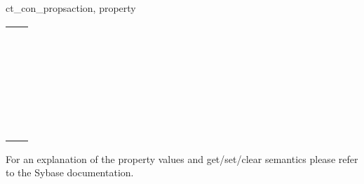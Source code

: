\begin{methoddesc}[CS_CONNECTION]{ct_con_props}{action, property }
\begin{longtable}{l|l}
\code{CS_CON_STATUS}           & \code{int} \\
\code{CS_LOOP_DELAY}           & \code{int} \\
\code{CS_RETRY_COUNT}          & \code{int} \\
\code{CS_NETIO}                & \code{int} \\
\code{CS_TEXTLIMIT}            & \code{int} \\
\code{CS_DS_SEARCH}            & \code{int} \\
\code{CS_DS_SIZELIMIT}         & \code{int} \\
\code{CS_DS_TIMELIMIT}         & \code{int} \\
\code{CS_ENDPOINT}             & \code{int} \\
\code{CS_PACKETSIZE}           & \code{int} \\
\code{CS_SEC_CREDTIMEOUT}      & \code{int} \\
\code{CS_SEC_SESSTIMEOUT}      & \code{int} \\

\code{CS_APPNAME}              & \code{string} \\
\code{CS_HOSTNAME}             & \code{string} \\
\code{CS_PASSWORD}             & \code{string} \\
\code{CS_SERVERNAME}           & \code{string} \\
\code{CS_USERNAME}             & \code{string} \\
\code{CS_TDS_VERSION}          & \code{string} \\
\code{CS_DS_DITBASE}           & \code{string} \\
\code{CS_DS_PASSWORD}          & \code{string} \\
\code{CS_DS_PRINCIPAL}         & \code{string} \\
\code{CS_DS_PROVIDER}          & \code{string} \\
\code{CS_SEC_KEYTAB}           & \code{string} \\
\code{CS_SEC_MECHANISM}        & \code{string} \\
\code{CS_SEC_SERVERPRINCIPAL}  & \code{string} \\
\code{CS_TRANSACTION_NAME}     & \code{string} \\

\code{CS_EED_CMD}              & \code{CS_COMMAND} \\
\end{longtable}

For an explanation of the property values and get/set/clear semantics
please refer to the Sybase documentation.


\end{methoddesc}
